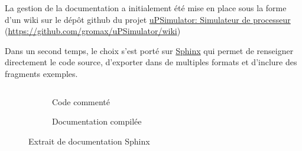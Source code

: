 La gestion de la documentation a initialement été mise en place sous la forme d'un wiki sur le dépôt github du projet \href{https://github.com/gromax/uPSimulator/wiki}{uPSimulator: Simulateur de processeur} (\url{https://github.com/gromax/uPSimulator/wiki})

Dans un second temps, le choix s'est porté sur \href{https://www.sphinx-doc.org/en/master/index.html}{Sphinx} qui permet de renseigner directement le code source, d'exporter dans de multiples formats et d'inclure des fragments exemples.


\begin{figure}[h!]
	\centering
	\begin{subfigure}[b]{0.43\textwidth}
		\inputminted[firstline=0,lastline=43,frame = single, fontsize=\scriptsize, tabsize=2, breaklines, autogobble]{python}{litteral.py}
		\caption{Code commenté}
	\end{subfigure}
\hfill
	\begin{subfigure}[b]{0.475\textwidth}
	\caption{Documentation compilée}
	\end{subfigure}
	\caption{Extrait de documentation Sphinx}
	\label{fig:sphinxdocexemple}
\end{figure}